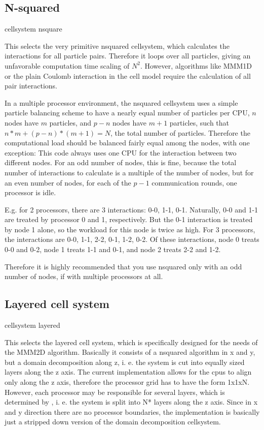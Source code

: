 \subsection{N-squared}
\begin{essyntax}
  cellsystem nsquare 
\end{essyntax}
This selects the very primitive nsquared cellsystem, which calculates
the interactions for all particle pairs. Therefore it loops over all
particles, giving an unfavorable computation time scaling of $N^2$.
However, algorithms like MMM1D or the plain Coulomb interaction in the
cell model require the calculation of all pair interactions.

In a multiple processor environment, the nsquared cellsystem uses a
simple particle balancing scheme to have a nearly equal number of
particles per CPU, \ie $n$ nodes have $m$ particles, and $p-n$ nodes
have $m+1$ particles, such that $n*m+(p-n)*(m+1)=N$, the total number
of particles. Therefore the computational load should be balanced
fairly equal among the nodes, with one exception: This code always
uses one CPU for the interaction between two different nodes. For an
odd number of nodes, this is fine, because the total number of
interactions to calculate is a multiple of the number of nodes, but
for an even number of nodes, for each of the $p-1$ communication
rounds, one processor is idle.

E.g. for 2 processors, there are 3 interactions: 0-0, 1-1, 0-1.
Naturally, 0-0 and 1-1 are treated by processor 0 and 1, respectively.
But the 0-1 interaction is treated by node 1 alone, so the workload
for this node is twice as high. For 3 processors, the interactions are
0-0, 1-1, 2-2, 0-1, 1-2, 0-2. Of these interactions, node 0 treats 0-0
and 0-2, node 1 treats 1-1 and 0-1, and node 2 treats 2-2 and 1-2.

Therefore it is highly recommended that you use nsquared only with an
odd number of nodes, if with multiple processors at all. 

\subsection{Layered cell system}
\begin{essyntax}
  cellsystem layered 
\end{essyntax}

This selects the layered cell system, which is specifically designed
for the needs of the MMM2D algorithm. Basically it consists of a
nsquared algorithm in x and y, but a domain decomposition along z, i.
e. the system is cut into equally sized layers along the z axis. The
current implementation allows for the cpus to align only along the z
axis, therefore the processor grid has to have the form 1x1xN.
However, each processor may be responsible for several layers, which
is determined by , i. e. the system is split into
N* layers along the z axis. Since in x and y direction
there are no processor boundaries, the implementation is basically
just a stripped down version of the domain decomposition cellsystem.

